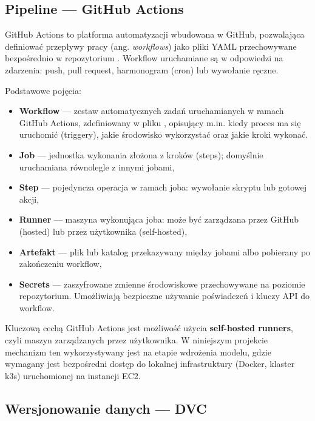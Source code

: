 \subsection{Pipeline --- GitHub Actions}
\label{subsec:github-actions-intro}

GitHub Actions to platforma automatyzacji wbudowana w GitHub, pozwalająca definiować przepływy pracy (ang. \textit{workflows}) jako pliki YAML przechowywane bezpośrednio w repozytorium \cite{github_actions_docs}. Workflow uruchamiane są w odpowiedzi na zdarzenia: push, pull request, harmonogram (cron) lub wywołanie ręczne.

Podstawowe pojęcia:
\begin{sloppypar}
\begin{itemize}
  \item \textbf{Workflow} --- zestaw automatycznych zadań uruchamianych w ramach GitHub Actions, zdefiniowany w pliku , opisujący m.in. kiedy proces ma się uruchomić (triggery), jakie środowisko wykorzystać oraz jakie kroki wykonać.
  \item \textbf{Job} --- jednostka wykonania złożona z kroków (steps); domyślnie uruchamiana równolegle z innymi jobami,
  \item \textbf{Step} --- pojedyncza operacja w ramach joba: wywołanie skryptu lub gotowej akcji,
  \item \textbf{Runner} --- maszyna wykonująca joba: może być zarządzana przez GitHub (hosted) lub przez użytkownika (self-hosted),
  \item \textbf{Artefakt} --- plik lub katalog przekazywany między jobami albo pobierany po zakończeniu workflow,
  \item \textbf{Secrets} --- zaszyfrowane zmienne środowiskowe przechowywane na poziomie repozytorium. Umożliwiają bezpieczne używanie poświadczeń i kluczy API do workflow.
\end{itemize}
\end{sloppypar}

Kluczową cechą GitHub Actions jest możliwość użycia \textbf{self-hosted runners}, czyli maszyn zarządzanych przez użytkownika. W niniejszym projekcie mechanizm ten wykorzystywany jest na etapie wdrożenia modelu, gdzie wymagany jest bezpośredni dostęp do lokalnej infrastruktury (Docker, klaster k3s) uruchomionej na instancji EC2.

\subsection{Wersjonowanie danych --- DVC}
\label{subsec:dvc}

